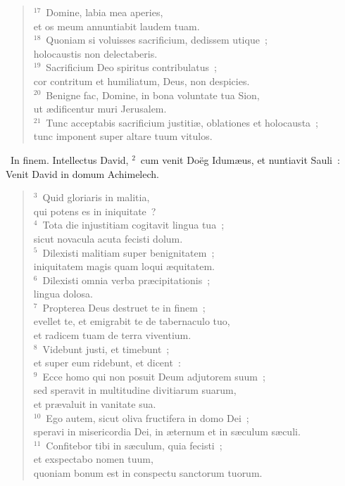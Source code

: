 \begin{flushleft}
\begin{verse}
${}^{17}$~Domine, labia mea aperies,\\ et os meum annuntiabit laudem tuam.\\
${}^{18}$~Quoniam si voluisses sacrificium, dedissem utique~;\\ holocaustis non delectaberis.\\
${}^{19}$~Sacrificium Deo spiritus contribulatus~;\\ cor contritum et humiliatum, Deus, non despicies.\\
${}^{20}$~Benigne fac, Domine, in bona voluntate tua Sion,\\ ut \ae dificentur muri Jerusalem.\\
${}^{21}$~Tunc acceptabis sacrificium justiti\ae , oblationes et holocausta~;\\ tunc imponent super altare tuum vitulos.\end{verse}\end{flushleft}


~\lettrine[lines=10,image=true,loversize=0.05,lraise=-0.03]{I}{}n finem. Intellectus David,
${}^{2}$~cum venit Do\"eg Idum\ae us, et nuntiavit Sauli~: Venit David in domum Achimelech.
\begin{flushleft}\begin{verse}${}^{3}$~Quid gloriaris in malitia,\\ qui potens es in iniquitate~?\\
${}^{4}$~Tota die injustitiam cogitavit lingua tua~;\\ sicut novacula acuta fecisti dolum.\\
${}^{5}$~Dilexisti malitiam super benignitatem~;\\ iniquitatem magis quam loqui \ae quitatem.\\
${}^{6}$~Dilexisti omnia verba pr\ae cipitationis~;\\ lingua dolosa.\\
${}^{7}$~Propterea Deus destruet te in finem~;\\ evellet te, et emigrabit te de tabernaculo tuo,\\ et radicem tuam de terra viventium.\\
${}^{8}$~Videbunt justi, et timebunt~;\\ et super eum ridebunt, et dicent~:\\
${}^{9}$~Ecce homo qui non posuit Deum adjutorem suum~;\\ sed speravit in multitudine divitiarum suarum,\\ et pr\ae valuit in vanitate sua.\\
${}^{10}$~Ego autem, sicut oliva fructifera in domo Dei~;\\ speravi in misericordia Dei, in \ae ternum et in s\ae culum s\ae culi.\\
${}^{11}$~Confitebor tibi in s\ae culum, quia fecisti~;\\ et exspectabo nomen tuum,\\ quoniam bonum est in conspectu sanctorum tuorum.\end{verse}\end{flushleft}


